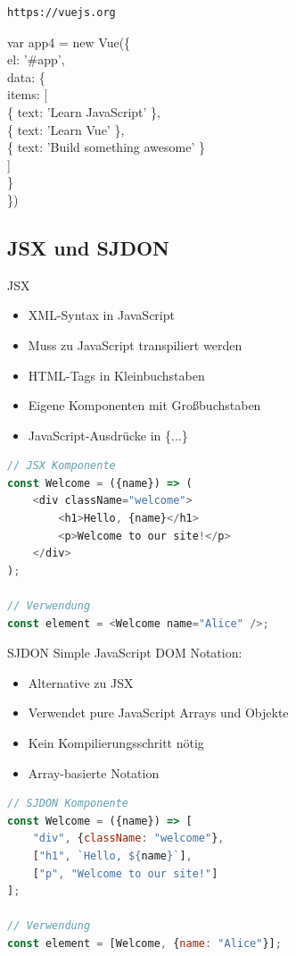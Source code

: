 \begin{verbatim}
https://vuejs.org
\end{verbatim}

var app4 = new Vue(\{\\
el: '\#app',\\
data: \{\\
items: [\\
\{ text: 'Learn JavaScript' \},\\
\{ text: 'Learn Vue' \},\\
\{ text: 'Build something awesome' \}\\[0pt]
]\\
\}\\
\})

\columnbreak

\subsection{JSX und SJDON}

\begin{definition}{JSX}
    \begin{itemize}
        \item XML-Syntax in JavaScript
        \item Muss zu JavaScript transpiliert werden
        \item HTML-Tags in Kleinbuchstaben
        \item Eigene Komponenten mit Großbuchstaben
        \item JavaScript-Ausdrücke in \{...\}
    \end{itemize}
\begin{lstlisting}[language=JavaScript, style=basesmol]
// JSX Komponente
const Welcome = ({name}) => (
    <div className="welcome">
        <h1>Hello, {name}</h1>
        <p>Welcome to our site!</p>
    </div>
);

// Verwendung
const element = <Welcome name="Alice" />;
\end{lstlisting}
\end{definition}

\begin{definition}{SJDON}
    Simple JavaScript DOM Notation:
    \begin{itemize}
        \item Alternative zu JSX
        \item Verwendet pure JavaScript Arrays und Objekte
        \item Kein Kompilierungsschritt nötig
        \item Array-basierte Notation
    \end{itemize}
\begin{lstlisting}[language=JavaScript, style=basesmol]
// SJDON Komponente
const Welcome = ({name}) => [
    "div", {className: "welcome"},
    ["h1", `Hello, ${name}`],
    ["p", "Welcome to our site!"]
];

// Verwendung
const element = [Welcome, {name: "Alice"}];
\end{lstlisting}
\end{definition}

